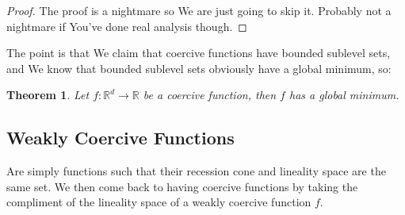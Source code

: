 \documentclass{article}
\newtheorem{theorem}{Theorem}[section]
\begin{document}
		\begin{proof}
			The proof is a nightmare so We are just going to skip it. Probably not a nightmare if You've done real analysis though.
		\end{proof}
			
			The point is that We claim that coercive functions have bounded sublevel sets, and We know that bounded sublevel sets obviously have a global minimum, so:
		
		\begin{theorem}
			Let $f:\mathbb{R}^d\to\mathbb{R}$ be a coercive function, then $f$ has a global minimum.
		\end{theorem}
		
	\subsection{Weakly Coercive Functions}
	
		Are simply functions such that their recession cone and lineality space are the same set. We then come back to having coercive functions by taking the compliment of the lineality space of a weakly coercive function $f$.
		
		
		
		
		
		
\end{document}
